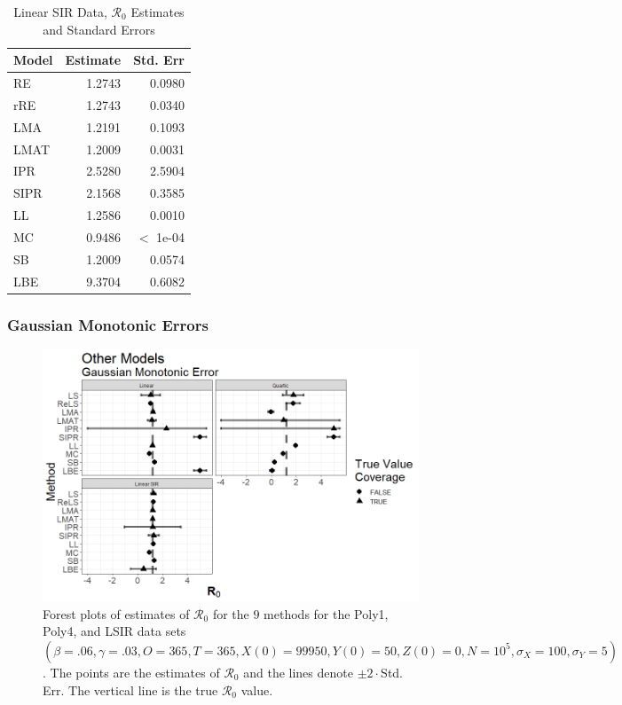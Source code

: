 \documentclass[12pt]{article}
\newcommand{\xxsir}{\ensuremath{9} } %
\newcommand{\rr}{\ensuremath{\mathcal{R}_0}}
\begin{document}
\begin{table}[H]
	
	\centering
	\begin{tabular}[t]{l|r|r}
		\hline
		Model & Estimate & Std. Err\\
		\hline
		RE & 1.2743 & 0.0980\\
		\hline
		rRE & 1.2743 & 0.0340\\
		\hline
		LMA & 1.2191 & 0.1093\\
		\hline
		LMAT & 1.2009 & 0.0031\\
		\hline
		IPR & 2.5280 & 2.5904\\
		\hline
		SIPR & 2.1568 & 0.3585\\
		\hline
		LL & 1.2586 & 0.0010\\
		\hline
		MC & 0.9486 & $<$ 1e-04 \\
		\hline
		SB & 1.2009 & 0.0574\\
		\hline
		LBE & 9.3704 & 0.6082\\
		\hline
	\end{tabular}
	\caption{Linear SIR Data, $\rr$ Estimates and Standard Errors}\label{tab:other-res3}
\end{table}

\subsubsection{Gaussian Monotonic Errors}

\begin{figure}[H]
	\begin{center}
		\includegraphics[scale=0.5]{images/other_nm.tiff}
		\caption{Forest plots of estimates of $\rr$ for the \xxsir methods for the Poly1, Poly4, and LSIR data sets $(\beta=.06, \gamma=.03, O=365, T=365, X(0)=99950, Y(0)=50, Z(0)=0, N=10^5, \sigma_X=100, \sigma_Y=5)$.  The points are the estimates of $\rr$ and the lines denote $\pm 2\cdot $Std. Err.  The vertical line is the true $\rr$ value.}
	\end{center}
\end{figure}
\end{document}
